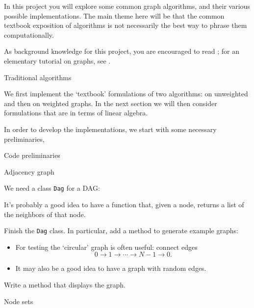
In this project you will explore some common graph algorithms,
and their various possible implementations.
The main theme here will be that the common textbook exposition
of algorithms is not necessarily the best way to phrase them
computationally.

As background knowledge for this project,
you are encouraged to read ;
for an elementary tutorial on graphs, see .

 {Traditional algorithms}

We first implement the `textbook' formulations of two
 algorithms: on unweighted and then on weighted graphs.
In the next section we will then consider formulations
that are in terms of linear algebra.

In order to develop the implementations, we start with some necessary preliminaries,

 {Code preliminaries}

 {Adjacency graph}

We need a class \lstinline{Dag} for a \acf{DAG}:

It's probably a good idea to have a function
that, given a node, returns a list of the neighbors of that node.

\begin{exercise}
  Finish the \lstinline{Dag} class. In particular,
  add a method to generate example graphs:
  \begin{itemize}
  \item For testing the `circular' graph is often useful:
    connect edges
    \[ 0\rightarrow 1\rightarrow \cdots \rightarrow N-1 \rightarrow 0. \]
  \item It may also be a good idea to have a graph with random edges.
  \end{itemize}
  Write a method that displays the graph.
\end{exercise}

 {Node sets}

